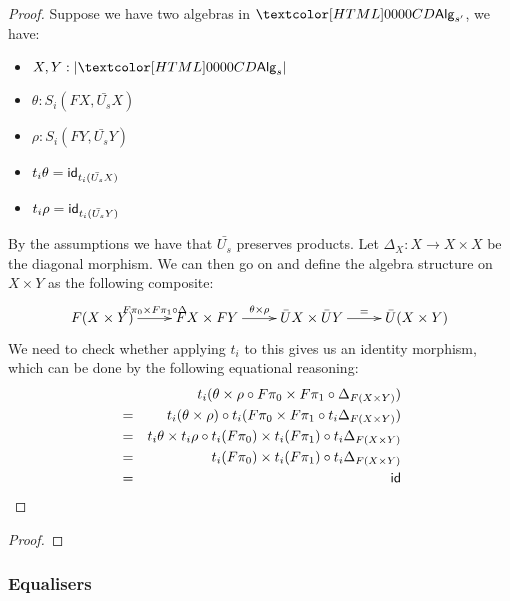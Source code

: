 \begin{proof}
  Suppose we have two algebras in $\Alg_{s'}$, \ie we have:
  \begin{itemize}
  \item $X, Y : | \Alg_s |$
  \item $\theta : S_i(FX,\bar{U_s}X)$
  \item $\rho : S_i(FY,\bar{U_s}Y)$
  \item $t_i \theta = \mathsf{id}_{t_i (\bar{U_s} X)}$
  \item $t_i \rho = \mathsf{id}_{t_i (\bar{U_s} Y)}$
  \end{itemize}

  By the assumptions we have that $\bar{U_s}$ preserves products.  Let
  $\Delta_X : X \to X \times X$ be the diagonal morphism. We can then
  go on and define the algebra structure on $X \times Y$ as the
  following composite:
  $$
  \xymatrix{ F(X \times Y) \ar[r]^{F \pi_0 \times F \pi_1 \circ \Delta} &
    FX \times FY \ar[r]^{\theta \times \rho} 
    &\bar{U}X \times \bar{U}Y \ar[r]^{=} & \bar{U}(X \times Y) }
  $$
  We need to check whether applying $t_i$ to this gives us an identity
  morphism, which can be done by the following equational reasoning:
  \begin{align*}
    &&t_i (\theta \times \rho \circ F \pi_0 \times F \pi_1 \circ \Delta_{F(X \times Y)} ) \\
    &=&t_i (\theta \times \rho) \circ t_i (F \pi_0 \times F \pi_1 \circ t_i \Delta_{F(X \times Y)} ) \\
    &=&t_i \theta \times t_i \rho \circ t_i (F \pi_0) \times t_i (F \pi_1) \circ t_i \Delta_{F (X \times Y)} \\
    &=&t_i (F \pi_0) \times t_i (F \pi_1) \circ t_i \Delta_{F (X \times Y)} \\ 
    &=&\mathsf{id}
  \end{align*}

\end{proof}

\begin{lemma}
  
\end{lemma}

\begin{proof}
  
\end{proof}

\subsubsection{Equalisers}

